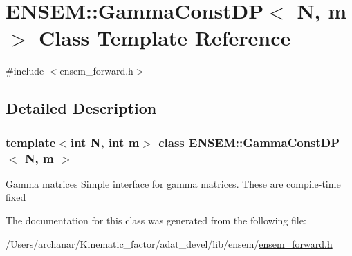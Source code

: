\hypertarget{classENSEM_1_1GammaConstDP}{}\section{E\+N\+S\+EM\+:\+:Gamma\+Const\+DP$<$ N, m $>$ Class Template Reference}
\label{classENSEM_1_1GammaConstDP}


{\ttfamily \#include $<$ensem\+\_\+forward.\+h$>$}



\subsection{Detailed Description}
\subsubsection*{template$<$int N, int m$>$\newline
class E\+N\+S\+E\+M\+::\+Gamma\+Const\+D\+P$<$ N, m $>$}

Gamma matrices Simple interface for gamma matrices. These are compile-\/time fixed 

The documentation for this class was generated from the following file\+:\begin{DoxyCompactItemize}
\item 
/\+Users/archanar/\+Kinematic\+\_\+factor/adat\+\_\+devel/lib/ensem/\mbox{\hyperlink{lib_2ensem_2ensem__forward_8h}{ensem\+\_\+forward.\+h}}\end{DoxyCompactItemize}
